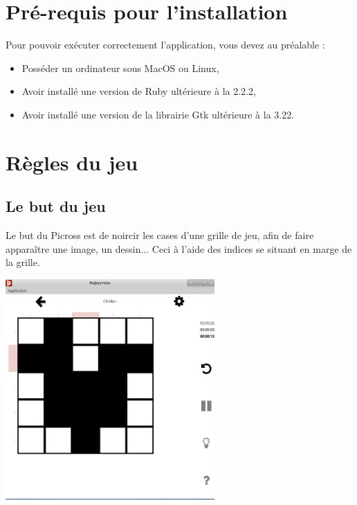 \documentclass[a4paper, 12pt]{report}
\begin{document}
\begin{titlepage}
\begin{center}
	\end{center}
\end{titlepage}

\renewcommand{\contentsname}{Sommaire}
\tableofcontents
\thispagestyle{empty}
\thispagestyle{plain}



\chapter{Pré-requis pour l'installation}
\thispagestyle{empty}
\thispagestyle{plain}
    
    Pour pouvoir exécuter correctement l'application, vous devez au préalable :
    \begin{itemize}
        \item Posséder un ordinateur sous MacOS ou Linux,
        \item Avoir installé une version de Ruby ultérieure à la 2.2.2,
        \item Avoir installé une version de la librairie Gtk ultérieure à la 3.22.
    \end{itemize}


\chapter{Règles du jeu}
\thispagestyle{empty}
\thispagestyle{plain}


		\section{Le but du jeu}

            Le but du Picross est de noircir les cases d'une grille de jeu, afin de faire apparaître une image, un dessin... Ceci à l'aide des indices se situant en marge de la grille.
            
            \begin{minipage}{\linewidth}
                    \centering
			        \includegraphics[width=8cm]{exempleGrille.png}
	        \end{minipage}
\end{document}
